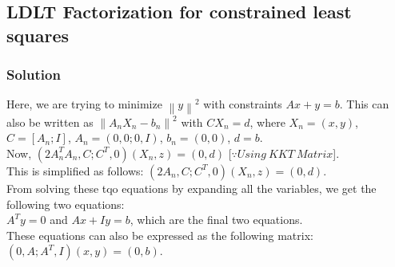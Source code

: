 \documentclass{article}
\newcommand{\norm}[1]{\left\lVert#1\right\rVert}
\begin{document}
\subsection*{LDLT Factorization for constrained least squares}
\subsubsection*{Solution}
Here, we are trying to minimize $\norm{y}^2$ with constraints $Ax + y = b$. This can also be written as $\norm{A_nX_n-b_n}^2$ with $CX_n=d$, where $X_n = (x, y)$, $C = [A_n;I]$, $A_n = (0,0;0,I)$, $b_n = (0,0)$, $d=b$.\\
Now, $(2A^T_nA_n, C;C^T,0)(X_n,z) = (0,d)$ [$\because Using\ KKT\ Matrix$].\\
This is simplified as follows: 
$(2A_n, C;C^T,0)(X_n,z) = (0,d)$.\\
From solving these tqo equations by expanding all the variables, we get the following two equations:\\
$A^Ty=0$ and $Ax+Iy=b$, which are the final two equations.\\
These equations can also be expressed as the following matrix:
$(0,A;A^T,I)(x,y) = (0,b)$.
\end{document}
